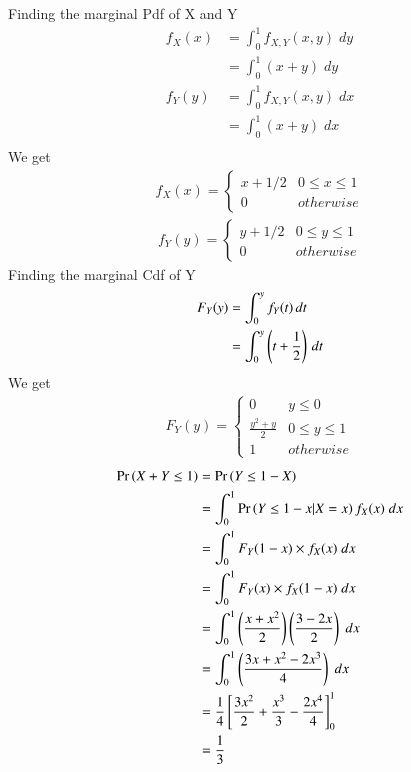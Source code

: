 Finding the marginal Pdf of X and Y
\begin{align}
f_{X}(x)&=\int_{0}^{1} f_{X,Y}(x,y)\;dy\\
&=\int_{0}^{1} (x+y)\;dy\\
f_{Y}(y)&=\int_{0}^{1} f_{X,Y}(x,y)\;dx\\
&=\int_{0}^{1} (x+y)\;dx\\
\end{align}
We get
\begin{align}
f_{X}(x)=  \begin{cases}
    x+1/2 & 0\leq x \leq 1 \\
    0 & otherwise
\end{cases}    
\end{align}
\begin{align}
f_{Y}(y)=  \begin{cases}
    y+1/2 & 0\leq y \leq 1 \\
    0 & otherwise
\end{cases}
\end{align}
Finding the marginal Cdf of Y
\begin{align}
F_{Y}(y)&=\int _{0 }^{y}f_{Y}(t)\,dt \\ 
&=\int _{0 }^{y}\left(t+\frac{1}{2}\right)\,dt \\ 
\end{align}
We get 
\begin{align}
 F_{Y}(y)=  \begin{cases}
    0  & y\leq 0 \\  
    \frac{y^2+y}{2} & 0\leq y \leq 1 \\
    1 & otherwise
\end{cases}   
\end{align}
\begin{align}
\Pr\left(X+Y\leq 1\right)&=\Pr\left(Y\leq 1-X\right) \\
&=\int_{0}^{1} \Pr\left(Y \leq 1-x|X=x\right)f_X(x)\;dx
\\
&=\int_{0}^{1} F_Y(1-x)\times f_X(x)\;dx
\\
&=\int_{0}^{1}F_Y(x)\times f_X(1-x)\;dx 
\\
&=\int_{0}^{1} \left(\frac{x+x^2}{2} \right)\left(\frac{3-2x}{2}\right)\;dx
\\
&=\int_{0}^{1} \left(\frac{3x+x^2-2x^3}{4} \right)\;dx
\\
&= \frac{1}{4}{}\left[{\frac{3x^2}{2}+\frac{x^3}{3}-\frac{2x^4}{4}}\right]_{0}^{1}
\\
&=\frac{1}{3}
\end{align}
